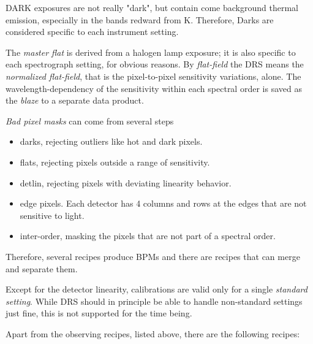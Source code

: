 DARK exposures are not really "dark", but contain come background thermal
emission, especially in the bands redward from K. Therefore, Darks are
considered specific to each instrument setting.

The \emph{master flat} is derived from a halogen lamp exposure; it is also
specific to each spectrograph setting, for obvious reasons. By \emph{flat-field}
the DRS means the \emph{normalized flat-field}, that is the pixel-to-pixel
sensitivity variations, alone. The wavelength-dependency of the sensitivity
within each spectral order is saved as the \emph{blaze} to a separate data
product.

\emph{Bad pixel masks} can come from several steps
\begin{itemize}
    \item darks, rejecting outliers like hot and dark pixels.
    \item flats, rejecting pixels outside a range of sensitivity.
    \item detlin, rejecting pixels with deviating linearity behavior.
    \item edge pixels. Each detector has 4 columns and rows at the edges that
        are not sensitive to light.
    \item inter-order, masking the pixels that are not part of a spectral order.
\end{itemize}

Therefore, several recipes produce BPMs and there are recipes that can merge
and separate them.

Except for the detector linearity, calibrations are valid only for a
single \textit{standard setting}. While DRS should in principle be able to
handle non-standard settings just fine, this is not supported for the time
being.

Apart from the observing recipes, listed above, there are the following recipes:

